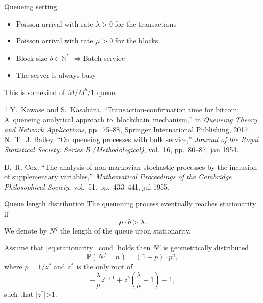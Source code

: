 \documentclass{beamer}
\begin{document}
\begin{frame}{Queueing setting}

\begin{itemize}
\item Poisson arrival with rate $\lambda>0$ for the transactions
\item Poisson arrival with rate $\mu>0$ for the blocks 
\item Block size $b\in\mathbb{N}^\ast$
$\Rightarrow $Batch service
\item[\warning] The server is always busy
\end{itemize}
This is somekind of $M/M^b/1$ queue.
\tiny
\begin{thebibliography}{1}
Y.~Kawase and S.~Kasahara, ``Transaction-confirmation time for bitcoin:
  A~queueing analytical approach to~blockchain~mechanism,'' in {\em Queueing
  Theory and Network Applications}, pp.~75--88, Springer International
  Publishing, 2017.
N.~T.~J. Bailey, ``On queueing processes with bulk service,'' {\em Journal of
  the Royal Statistical Society: Series B (Methodological)}, vol.~16,
  pp.~80--87, jan 1954.

D.~R. Cox, ``The analysis of non-markovian stochastic processes by the
  inclusion of supplementary variables,'' {\em Mathematical Proceedings of the
  Cambridge Philosophical Society}, vol.~51, pp.~433--441, jul 1955.

\end{thebibliography}
\end{frame}
\begin{frame}{Queue length distribution}
\scriptsize
The queueuing process eventually reaches stationarity if 
\begin{equation}\label{eq:stationarity_cond}
\mu\cdot b > \lambda.
\end{equation}
We denote by $N^q$ the length of the queue upon stationarity. 
\begin{tcolorbox}[enhanced,drop shadow, title=The blockchain efficiency theorem]
Assume that \eqref{eq:stationarity_cond} holds then $N^q$ is geometrically distributed 
$$
\mathbb{P}(N^q = n) = (1-p)\cdot p^n,
$$
where $p = 1/z^\ast$ and $z^\ast$ is the only root of 
$$
-\frac{\lambda}{\mu}z^{b+1}+z^b\left(\frac{\lambda}{\mu}+1\right) - 1,
$$
such that $|z^\ast$|>1.  
\end{tcolorbox}
\end{frame}
\end{document}
